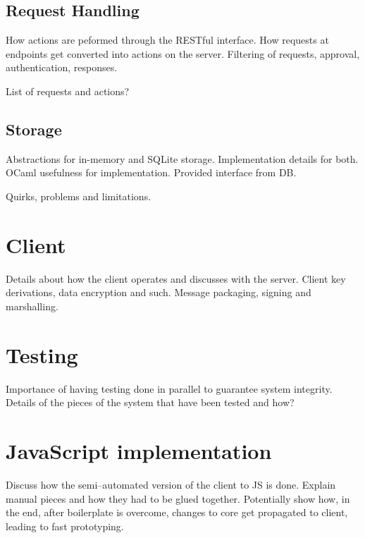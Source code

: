 \subsection{Request Handling}
How actions are peformed through the RESTful interface.
How requests at endpoints get converted into actions on the server.
Filtering of requests, approval, authentication, responses.

List of requests and actions?

\subsection{Storage}
Abstractions for in-memory and SQLite storage.
Implementation details for both.
OCaml usefulness for implementation.
Provided interface from DB.

Quirks, problems and limitations.

\section{Client}
Details about how the client operates and discusses with the server.
Client key derivations, data encryption and such.
Message packaging, signing and marshalling.

\section{Testing}
Importance of having testing done in parallel to guarantee system integrity.
Details of the pieces of the system that have been tested and how?

\section{JavaScript implementation}
Discuss how the semi--automated version of the client to JS is done.
Explain manual pieces and how they had to be glued together.
Potentially show how, in the end, after boilerplate is overcome, changes to core get propagated to client, leading to fast prototyping.

